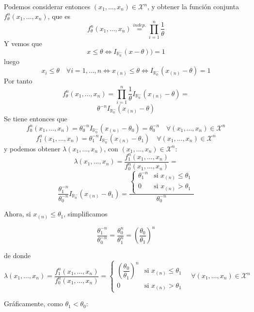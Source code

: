 \documentclass[12pt]{article}
\newcommand{\R}{\mathbb{R}}
\newcommand{\X}{\mathcal{X}}
\begin{document}
\begin{ejercicio}[1.75 puntos]
        Podemos considerar entonces $(x_1, \ldots, x_n) \in \X^n$, y obtener la función conjunta $f_\theta^n(x_1, \ldots, x_n)$, que es 
        $$f_\theta^n(x_1, \ldots, x_n) \stackrel{indep.}{=} \prod_{i=1}^n \frac{1}{\theta}$$ 
        Y vemos que $$x \leq \theta \iff I_{\R_0^{-}}(x - \theta)) = 1$$
        luego $$x_i \leq \theta \quad \forall i = 1, \ldots, n \iff x_{(n)} \leq \theta \iff I_{\R_0^{-}}(x_{(n)} - \theta) = 1$$
        Por tanto $$f_\theta^n(x_1, \ldots, x_n) = \prod_{i=1}^n \frac{1}{\theta} I_{\R_0^{-}}(x_{(n)} - \theta) = $$
        $$\theta^{-n} I_{\R_0^{-}}(x_{(n)} - \theta)$$
        Se tiene entonces que
        $$f_0^n(x_1, \ldots, x_n) = \theta_0^{-n} I_{\R_0^{-}}(x_{(n)} - \theta_0) = \theta_0^{-n} \quad \forall (x_1, \ldots, x_n) \in \X^n$$
        $$f_1^n(x_1, \ldots, x_n) = \theta_1^{-n} I_{\R_0^{-}}(x_{(n)} - \theta_1) \quad \forall (x_1, \ldots, x_n) \in \X^n$$
        y podemos obtener $\lambda(x_1, \ldots, x_n)$, con $(x_1, \ldots, x_n) \in \X^n$: 
        $$\lambda(x_1, \ldots, x_n) = \dfrac{f_1^n(x_1, \ldots, x_n)}{f_0^n(x_1, \ldots, x_n)} = $$$$
        \dfrac{\theta_1^{-n}}{\theta_0^{-n}} I_{\R_0^{-}}(x_{(n)} - \theta_1) = 
        \dfrac{\begin{cases} \theta_1^{-n} &\text{si } x_{(n)} \leq \theta_1 \\ 0 &\text{si } x_{(n)} > \theta_1 \end{cases}}
        {\theta_0^{-n}}$$

        Ahora, si $x_{(n)} \leq \theta_1$, simplificamos

        $$\dfrac{\theta_1^{-n}}{\theta_0^{-n}} = \dfrac{\theta_0^{n}}{\theta_1^{n}} = \left( \dfrac{\theta_0}{\theta_1} \right)^{n}$$

        de donde
        $$\lambda(x_1, \ldots, x_n) = \dfrac{f_1^n(x_1, \ldots, x_n)}{f_0^n(x_1, \ldots, x_n)} = 
        \begin{cases} 
            \left( \dfrac{\theta_0}{\theta_1} \right)^{n} &\text{si } x_{(n)} \leq \theta_1 \\ 
            0 &\text{si } x_{(n)} > \theta_1 
        \end{cases} \quad \forall (x_1, \ldots, x_n) \in \X^n$$

        Gráficamente, como $\theta_1 < \theta_0$:

        \begin{center}

            \begin{tikzpicture}[x=0.75pt,y=0.75pt,yscale=-1,xscale=1]


\end{tikzpicture}
\end{center}
\end{ejercicio}
\end{document}

